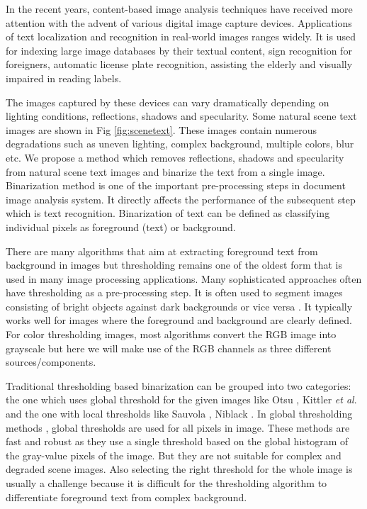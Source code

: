 In the recent years, content-based image analysis techniques have received more attention with the
advent of various digital image capture devices.
Applications of text localization
and recognition in real-world images ranges widely. It is used for indexing large image
databases by their textual content, sign recognition
for foreigners, automatic license plate recognition, assisting the elderly and visually
impaired in reading labels.

The images captured by these devices can vary dramatically depending on lighting conditions, reflections,
shadows and specularity. Some natural scene text images are shown in Fig \ref{fig:scenetext}.
These images contain numerous degradations such as uneven lighting, complex background, multiple colors, blur etc.
We propose a method which removes reflections, shadows and specularity from natural scene text images and
binarize the text from a single image.
Binarization method is one of the important pre-processing steps in document image analysis system.
It directly affects the performance of the subsequent step which is text recognition.
Binarization of text can be defined as classifying individual pixels as foreground (text) or background.

There are many algorithms that aim at extracting foreground text from background in images but thresholding remains one of
the oldest form that is used in many image processing applications. Many sophisticated approaches often have thresholding as a pre-processing step.
It is often used to segment images consisting of bright objects against dark backgrounds or vice versa \cite{A1,A3,A4}.
It typically works well for images where the foreground and background are clearly defined.
For color thresholding images, most algorithms convert the
RGB image into grayscale but here we will make use of the RGB channels as three different sources/components.

Traditional thresholding based binarization can be grouped into two categories: the one which uses global
threshold for the given images like Otsu \cite{A2}, Kittler {\em et al}.
\cite{A5} and the one with local thresholds like Sauvola \cite{A6},
Niblack \cite{A9}. In global thresholding methods \cite{A2,A7}, global thresholds are
used for all pixels in image. These methods are fast and robust as
they use a single threshold based on the global histogram of the gray-value pixels of the image.
But they are not suitable for complex
and degraded scene images.
Also selecting the right threshold for the whole image is usually a challenge
because it is difficult for the thresholding
algorithm to differentiate foreground text from complex background.

